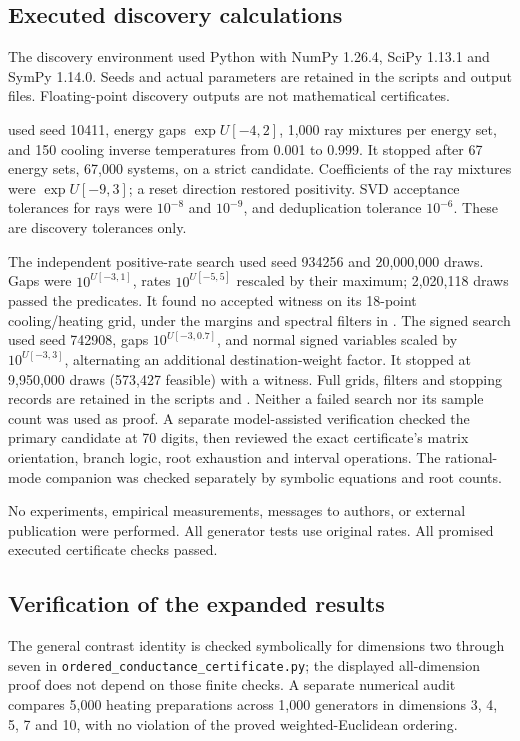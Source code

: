 \documentclass[11pt]{article}
\begin{document}
\subsection{Executed discovery calculations}
The discovery environment used Python with NumPy 1.26.4, SciPy 1.13.1 and SymPy 1.14.0. Seeds and actual parameters are retained in the scripts and output files. Floating-point discovery outputs are not mathematical certificates.

 used seed 10411, energy gaps $\exp U[-4,2]$, 1,000 ray mixtures per energy set, and 150 cooling inverse temperatures from 0.001 to 0.999. It stopped after 67 energy sets, 67,000 systems, on a strict candidate. Coefficients of the ray mixtures were $\exp U[-9,3]$; a reset direction restored positivity. SVD acceptance tolerances for rays were $10^{-8}$ and $10^{-9}$, and deduplication tolerance $10^{-6}$. These are discovery tolerances only.

The independent positive-rate search used seed 934256 and 20,000,000 draws. Gaps were $10^{U[-3,1]}$, rates $10^{U[-5,5]}$ rescaled by their maximum; 2,020,118 draws passed the predicates. It found no accepted witness on its 18-point cooling/heating grid, under the margins and spectral filters in . The signed search used seed 742908, gaps $10^{U[-3,0.7]}$, and normal signed variables scaled by $10^{U[-3,3]}$, alternating an additional destination-weight factor. It stopped at 9,950,000 draws (573,427 feasible) with a witness. Full grids, filters and stopping records are retained in the scripts and . Neither a failed search nor its sample count was used as proof. A separate model-assisted verification checked the primary candidate at 70 digits, then reviewed the exact certificate's matrix orientation, branch logic, root exhaustion and interval operations. The rational-mode companion was checked separately by symbolic equations and root counts.

No experiments, empirical measurements, messages to authors, or external publication were performed. All generator tests use original rates. All promised executed certificate checks passed.

\subsection{Verification of the expanded results}
The general contrast identity is checked symbolically for dimensions two through seven in
\texttt{ordered\_conductance\_certificate.py}; the displayed all-dimension proof does not
depend on those finite checks. A separate numerical audit compares 5,000 heating
preparations across 1,000 generators in dimensions 3, 4, 5, 7 and 10, with no violation
of the proved weighted-Euclidean ordering.
\end{document}

